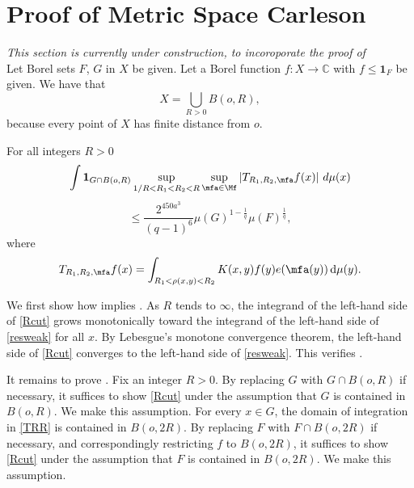 \chapter{Proof of Metric Space Carleson}
\label{thmfromproplinear}

\textit{This section is currently under construction, to incoroporate the proof of }\\

Let Borel sets $F$, $G$ in $X$ be given. Let a Borel function $f: X \to \mathbb{C}$ with $f \le \mathbf{1}_F$ be given.
We have that
\begin{equation}
    X=\bigcup_{R>0}B(o,R),
\end{equation} because every point of $X$
has finite distance from $o$.
\begin{lemma}[R truncation]
    \label{R-truncation}
    For all integers $R>0$
    $$
        \int \mathbf{1}_{G\cap B(o,R)}
        \sup_{1/R<R_1<R_2<R}\sup_{\mfa\in\Mf}
        \left| T_{R_1,R_2,\mfa} f(x) \right|\, d\mu(x)
    $$
    \begin{equation} \label{Rcut}
        \leq \frac{2^{450a^3}}{(q-1)^6} \mu(G)^{1-\frac{1}{q}} \mu(F)^{\frac{1}{q}},
    \end{equation}
    where
    \begin{equation}\label{TRR}
        T_{R_1,R_2,\mfa} f(x)=
        \int_{R_1 < \rho(x,y) < R_2} K(x,y) f(y) e(\mfa(y)) \, \mathrm{d}\mu(y) .
    \end{equation}
\end{lemma}

We first show how  implies . As $R$ tends to $\infty$, the integrand of the left-hand side of \eqref{Rcut} grows monotonically toward the integrand of the left-hand side of \eqref{resweak} for all $x$. By Lebesgue's monotone convergence theorem, the left-hand side of \eqref{Rcut} converges to the left-hand side of \eqref{resweak}. This verifies .

It remains to prove . Fix an integer $R>0$. By replacing $G$ with $G\cap B(o,R)$ if necessary, it suffices to show \eqref{Rcut} under the assumption that $G$ is contained in $B(o,R)$. We make this assumption. For every $x\in G$, the domain of integration in \eqref{TRR} is contained in $B(o,2R)$. By replacing $F$ with $F\cap B(o,2R)$ if necessary, and correspondingly restricting $f$ to $B(o, 2R)$, it suffices to show \eqref{Rcut} under the assumption that $F$ is contained in $B(o,2R)$. We make this assumption.

